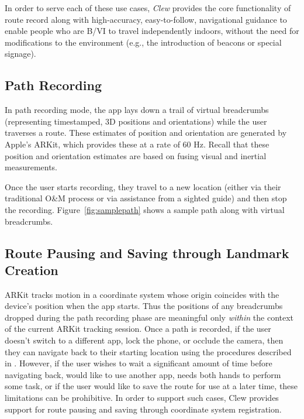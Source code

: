 \documentclass[chi_draft]{sigchi}
\newcommand{\BVI}{B/VI\xspace}
\newcommand{\OM}{O\&M\xspace}
\begin{document}
In order to serve each of these use cases, \emph{Clew} provides the core functionality of route record along with high-accuracy, easy-to-follow, navigational guidance to enable people who are \BVI to travel independently indoors, without the need for modifications to the environment (e.g., the introduction of beacons or special signage).

\subsection{Path Recording}

In path recording mode, the app lays down a trail of virtual breadcrumbs (representing timestamped, 3D positions and orientations) while the user traverses a route.  These estimates of position and orientation are generated by Apple's ARKit, which provides these at a rate of 60 Hz.  Recall that these position and orientation estimates are based on fusing visual and inertial measurements. %

Once the user starts recording, they travel to a new location (either via their traditional \OM process or via assistance from a sighted guide) and then stop the recording.  Figure~\ref{fig:samplepath} shows a sample path along with virtual breadcrumbs.
%
\subsection{Route Pausing and Saving through Landmark Creation}

ARKit tracks motion in a coordinate system whose origin coincides with the device's position when the app starts.  Thus the positions of any breadcrumbs dropped during the path recording phase are meaningful only \emph{within} the context of the current ARKit tracking session.  Once a path is recorded, if the user doesn't switch to a different app, lock the phone, or occlude the camera, then they can navigate back to their starting location using the procedures described in \emph{}.  However, if the user wishes to wait a significant amount of time before navigating back, would like to use another app, needs both hands to perform some task, or if the user would like to save the route for use at a later time, these limitations can be prohibitive.  In order to support such cases, Clew provides support for route pausing and saving through coordinate system registration.
\end{document}
